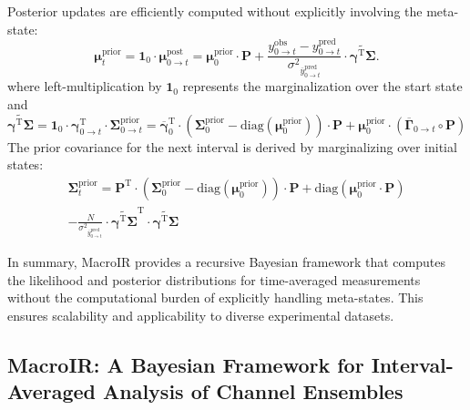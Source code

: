 \documentclass[pdflatex,sn-mathphys-num]{sn-jnl}%
\theoremstyle{thmstyleone}%
\theoremstyle{thmstyletwo}%
\theoremstyle{thmstylethree}%
\begin{document}
Posterior updates are efficiently computed without explicitly involving the meta-state:
\begin{equation}
	\boldsymbol{\mu}^{\mathrm{prior}}_{t} = 
	\boldsymbol{1}_0 \cdot 
	\boldsymbol{\mu}^{\mathrm{post}}_{0 \rightarrow t} = \boldsymbol{\mu}^{\mathrm{prior}}_0 \cdot \boldsymbol{P} + 
	\frac{y^{\mathrm{obs}}_{0 \rightarrow t} - y^{\mathrm{pred}}_{0 \rightarrow t}}{{\sigma^2}_{\overline{y}^{\mathrm{pred}}_{0 \rightarrow t}}} 
	\cdot \widetilde{\boldsymbol{\gamma}^{\mathrm{T}} \boldsymbol{\Sigma}}.
	\label{eq:macro_interval_posterior_mean}
\end{equation}
where left-multiplication by \( \mathbf{1}_0 \) represents the marginalization over the start state and
\begin{equation}
	\widetilde{\boldsymbol{\gamma}^{\mathrm{T}} \boldsymbol{\Sigma}} = \mathbf{1}_0 \cdot \mathbf{\gamma}^{\mathrm{T}}_{0 \rightarrow t} \cdot \mathbf{\Sigma}^{\mathrm{prior}}_{0 \rightarrow t} =
	\overline{\boldsymbol{\gamma}}_{0}^{\mathrm{T}} \cdot 
	\left( \boldsymbol{\Sigma}^{\mathrm{prior}}_{0} - \mathrm{diag}(\boldsymbol{\mu}^{\mathrm{prior}}_0) \right) \cdot \boldsymbol{P} 
	+ \boldsymbol{\mu}^{\mathrm{prior}}_0 \cdot \left( \overline{\boldsymbol{\Gamma}}_{0 \rightarrow t} \circ \boldsymbol{P} \right)
	\label{eq:interval_gamma_sigma}
\end{equation}
The prior covariance for the next interval is derived by marginalizing over initial states:
\begin{multline}
	\boldsymbol{\Sigma}^{\mathrm{prior}}_{t} = 
	\boldsymbol{P}^{\mathrm{T}} \cdot \left( \boldsymbol{\Sigma}^{\mathrm{prior}}_{0} - \mathrm{diag}(\boldsymbol{\mu}^{\mathrm{prior}}_{0}) \right) \cdot \boldsymbol{P}
	+ \mathrm{diag}(\boldsymbol{\mu}^{\mathrm{prior}}_{0} \cdot \boldsymbol{P}) \\
	- \frac{N}{{\sigma^2}_{\overline{y}^{\mathrm{pred}}_{0 \rightarrow t}}} \cdot
	\widetilde{\boldsymbol{\gamma}^{\mathrm{T}} \boldsymbol{\Sigma}}^{\mathrm{T}} \cdot \widetilde{\boldsymbol{\gamma}^{\mathrm{T}} \boldsymbol{\Sigma}}
	\label{eq:prior_covariance_update_0_t}
\end{multline}

In summary, MacroIR provides a recursive Bayesian framework that computes the likelihood and posterior distributions for time-averaged measurements without the computational burden of explicitly handling meta-states. This ensures scalability and applicability to diverse experimental datasets.


\subsection{MacroIR: A Bayesian Framework for Interval-Averaged Analysis of Channel Ensembles}
\end{document}
